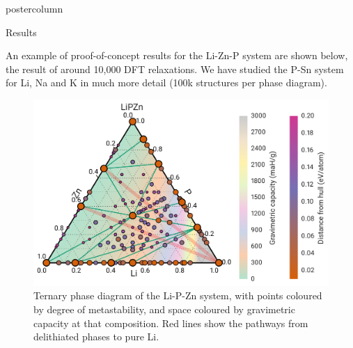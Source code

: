 \documentclass{beamer}
\newlength{\columnheight}
\begin{document}
\begin{frame}
\begin{columns}
	\begin{column}{.37\textwidth}
		\begin{beamercolorbox}[center]{postercolumn}
			\begin{minipage}{.98\textwidth} %
				\parbox[t][\columnheight]{\textwidth}{ %
            \begin{myblock}{Results}


                An example of proof-of-concept results for the Li-Zn-P system are shown below, the result of around 10,000 DFT relaxations. We have studied the P-Sn system for Li, Na and K in much more detail (100k structures per phase diagram).

            \begin{figure}
                \centering
              \includegraphics[width=\textwidth]{img/LiPZn.png}
              \caption{Ternary phase diagram of the Li-P-Zn system, with points coloured by degree of metastability, and space coloured by gravimetric capacity at that composition. Red lines show the pathways from delithiated phases to pure Li.}
            \end{figure}


\end{myblock}}
\end{minipage}
\end{beamercolorbox}
\end{column}
\end{columns}
\end{frame}
\end{document}

